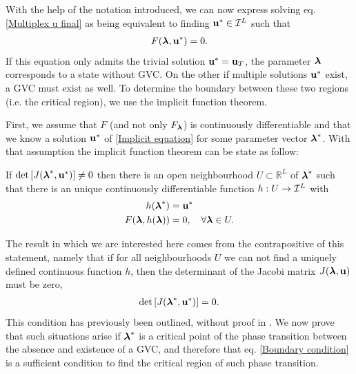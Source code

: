 \documentclass[
11pt, %
english, %
singlespacing, %
liststotoc, %
headsepline, %
]{MastersDoctoralThesis} %
\begin{document}
With the help of the notation introduced, we can now express solving eq. \eqref{Multiplex u final} as being equivalent to finding $\boldsymbol{\mathrm{u}}^* \in \mathcal{I}^L$ such that
\begin{align}
	F(\boldsymbol{\mathrm{\lambda}}, \boldsymbol{\mathrm{u}}^*) = 0. \label{Implicit equation}
\end{align}
If this equation only admits the trivial solution $\boldsymbol{\mathrm{u}}^* = \boldsymbol{\mathrm{u}}_T$, the parameter $\boldsymbol{\mathrm{\lambda}}$ corresponds to a state without GVC. On the other if multiple solutions $\boldsymbol{\mathrm{u}}^*$ exist, a GVC must exist as well. To determine the boundary between these two regions (i.e. the critical region), we use the implicit function theorem.

First, we assume that $F$ (and not only $F_{\boldsymbol{\mathrm{\lambda}}}$) is continuously differentiable and that we know a solution $\boldsymbol{\mathrm{u}}^*$ of \eqref{Implicit equation} for some parameter vector $\boldsymbol{\mathrm{\lambda}}^*$. With that assumption the implicit function theorem can be state as follow:

If $\det\left[ J(\boldsymbol{\mathrm{\lambda}}^*, \boldsymbol{\mathrm{u}}^*) \right] \neq 0$ then there is an open neighbourhood $U \subset \mathbb{R}^L$ of $\boldsymbol{\mathrm{\lambda}}^*$ such that there is an unique continuously differentiable function $h : U \rightarrow \mathcal{I}^L$ with
\begin{align}
	h(\boldsymbol{\mathrm{\lambda}}^*) &= \boldsymbol{\mathrm{u}}^* \\
	F(\boldsymbol{\mathrm{\lambda}}, h(\boldsymbol{\mathrm{\lambda}})) &= 0, \quad \forall \boldsymbol{\mathrm{\lambda}} \in U. \label{Implicit solution for F}
\end{align}

The result in which we are interested here comes from the contrapositive of this statement, namely that if for all neighbourhoods $U$ we can not find a uniquely defined continuous function $h$, then the determinant of the Jacobi matrix $J(\boldsymbol{\mathrm{\lambda}}, \boldsymbol{\mathrm{u}})$ must be zero,
\begin{align}
	\det\left[ J(\boldsymbol{\mathrm{\lambda}}^*, \boldsymbol{\mathrm{u}}^*) \right] = 0 \label{Boundary condition}.
\end{align}
This condition has previously been outlined, without proof in \cite{baxter2012avalanche}. We now prove that such situations arise if $\boldsymbol{\mathrm{\lambda}}^*$ is a critical point of the phase transition between the absence and existence of a GVC, and therefore that eq. \eqref{Boundary condition} is a sufficient condition to find the critical region of such phase transition.
\end{document}
